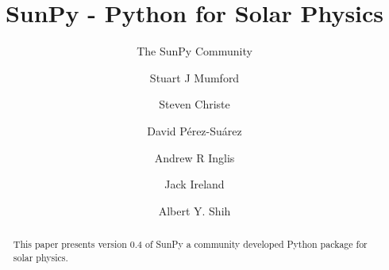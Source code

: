 \documentclass[12pt]{iopart}
\begin{document}
\title{SunPy - Python for Solar Physics}

\author{The SunPy Community}
\address{\url{http://sunpy.org}}

\author{Stuart J Mumford}
\address{Solar Physics \& Space Plasma Research Centre (SP$^{2}$RC), School of 
Mathematics and Statistics, The University of Sheffield, Hicks Building, 
Hounsfield Road, Sheffield, S3 7RH U.K.}

\author{Steven Christe}\
\address{NASA Goddard Space Flight Center, Greenbelt, U.S.A.}

\author{David P\'erez-Su\'arez}
\address{South African National Space Agency - Space Science,
Hospital Street, 7200 Hermanus, Western Cape, South Africa}

\author{Andrew R Inglis}
\address{NASA Goddard Space Flight Center, Greenbelt, USA}
\address{The Catholic University of America, Washington, DC, USA}

\author{Jack Ireland}
\address{ADNET Systems Inc., Mail Code 671.1, NASA Goddard Space
  Flight Center, Greenbelt, MD, U.S.A.}

\author{Albert Y. Shih}
\address{NASA Goddard Space Flight Center, Greenbelt, MD, USA}

\begin{abstract}
This paper presents version 0.4 of SunPy a community developed Python package 
for solar physics.

\end{abstract}

\maketitle


\label{sec:Intro}


\label{sec:DataTypes}


\label{sec:retrevial}


\label{sec:util}


\label{sec:ssw}


\label{sec:dev}


\label{sec:future}


{}
\end{document}
